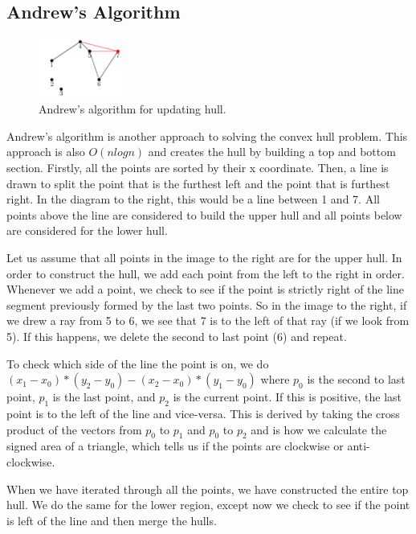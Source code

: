 \documentclass{article}
\begin{document}
\subsection{Andrew's Algorithm}

\begin{figure}
  \vspace{-40pt}
  \begin{center}
    \includegraphics[width=0.25\textwidth]{andrews.PNG}
  \end{center}
  \vspace{-10pt}
  \caption{Andrew's algorithm for updating hull.}
  \vspace{-10pt}
\end{figure}

Andrew's algorithm is another approach to solving the convex hull problem. This approach is also $O(n log n)$ and creates the hull by building a top and bottom section. Firstly, all the points are sorted by their x coordinate. Then, a line is drawn to split the point that is the furthest left and the point that is furthest right. In the diagram to the right, this would be a line between 1 and 7. All points above the line are considered to build the upper hull and all points below are considered for the lower hull. 

Let us assume that all points in the image to the right are for the upper hull. In order to construct the hull, we add each point from the left to the right in order. Whenever we add a point, we check to see if the point is strictly right of the line segment previously formed by the last two points. So in the image to the right, if we drew a ray from 5 to 6, we see that 7 is to the left of that ray (if we look from 5). If this happens, we delete the second to last point (6) and repeat.

To check which side of the line the point is on, we do $(x_1-x_0)*(y_2-y_0) - (x_2-x_0)*(y_1-y_0)$ where $p_0$ is the second to last point, $p_1$ is the last point, and $p_2$ is the current point. If this is positive, the last point is to the left of the line and vice-versa. This is derived by taking the cross product of the vectors from $p_0$ to $p_1$ and $p_0$ to $p_2$ and is how we calculate the signed area of a triangle, which tells us if the points are clockwise or anti-clockwise.

When we have iterated through all the points, we have constructed the entire top hull. We do the same for the lower region, except now we check to see if the point is left of the line and then merge the hulls.
\end{document}

